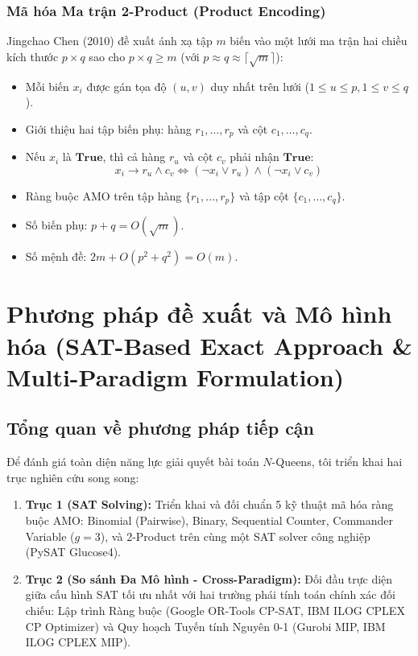 \documentclass[a4paper,fleqn]{cas-sc}
\begin{document}
\subsubsection{Mã hóa Ma trận 2-Product (Product Encoding)}
Jingchao Chen (2010) \cite{chen2010new} đề xuất ánh xạ tập $m$ biến vào một lưới ma trận hai chiều kích thước $p \times q$ sao cho $p \times q \ge m$ (với $p \approx q \approx \lceil \sqrt{m} \rceil$):
\begin{itemize}
    \item Mỗi biến $x_i$ được gán tọa độ $(u, v)$ duy nhất trên lưới ($1 \le u \le p, 1 \le v \le q$).
    \item Giới thiệu hai tập biến phụ: hàng $r_1, \dots, r_p$ và cột $c_1, \dots, c_q$.
    \item Nếu $x_i$ là $\mathbf{True}$, thì cả hàng $r_u$ và cột $c_v$ phải nhận $\mathbf{True}$:
    \begin{equation}
    x_i \to r_u \land c_v \iff (\neg x_i \lor r_u) \land (\neg x_i \lor c_v)
    \end{equation}
    \item Ràng buộc AMO trên tập hàng $\{r_1, \dots, r_p\}$ và tập cột $\{c_1, \dots, c_q\}$.
    \item Số biến phụ: $p + q = O(\sqrt{m})$.
    \item Số mệnh đề: $2m + O(p^2 + q^2) = O(m)$.
\end{itemize}

\section{Phương pháp đề xuất và Mô hình hóa (SAT-Based Exact Approach \& Multi-Paradigm Formulation)}
\label{sec:methodology}

\subsection{Tổng quan về phương pháp tiếp cận}
\label{subsec:method_overview}
Để đánh giá toàn diện năng lực giải quyết bài toán $N$-Queens, tôi triển khai hai trục nghiên cứu song song:
\begin{enumerate}
    \item \textbf{Trục 1 (SAT Solving):} Triển khai và đối chuẩn 5 kỹ thuật mã hóa ràng buộc AMO: Binomial (Pairwise), Binary, Sequential Counter, Commander Variable ($g=3$), và 2-Product trên cùng một SAT solver công nghiệp (PySAT Glucose4).
    \item \textbf{Trục 2 (So sánh Đa Mô hình - Cross-Paradigm):} Đối đầu trực diện giữa cấu hình SAT tối ưu nhất với hai trường phái tính toán chính xác đối chiếu: Lập trình Ràng buộc (Google OR-Tools CP-SAT, IBM ILOG CPLEX CP Optimizer) và Quy hoạch Tuyến tính Nguyên 0-1 (Gurobi MIP, IBM ILOG CPLEX MIP).
\end{enumerate}
\end{document}
